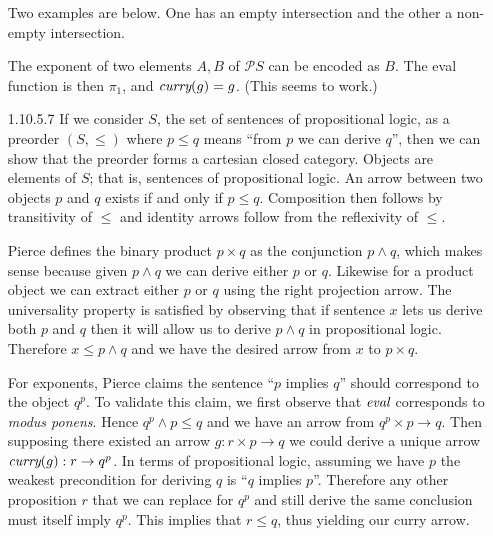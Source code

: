 \documentclass{article}
\newcommand{\curry}[1]{\emph{curry}(#1)}
\newcommand{\eval}{\emph{eval}}
\newcommand{\id}{\emph{id}}
\newcommand{\powset}{\mathcal{P}}
\newcommand{\set}[1]{\{#1\}}
\begin{document}
\begin{enumerate}
  Two examples are below.
  One has an empty intersection and the other a non-empty intersection.
  \begin{center}
  \end{center}

  The exponent of two elements $A,B$ of $\powset{S}$ can be encoded as $B$.
  The eval function is then $\pi_1$, and $\curry{g} = g$.
  (This seems to work.)

\vfill{}
\item [1.10.5.7]
  If we consider $S$, the set of sentences of propositional logic, as a preorder $(S, \le)$ where $p \le q$ means ``from $p$ we can derive $q$'', then we can show that the preorder forms a cartesian closed category.
  Objects are elements of $S$; that is, sentences of propositional logic.
  An arrow between two objects $p$ and $q$ exists if and only if $p \le q$.
  Composition then follows by transitivity of $\le$ and identity arrows follow from the reflexivity of $\le$.

  Pierce defines the binary product $p \times q$ as the conjunction $p \wedge q$, which makes sense because given $p \wedge q$ we can derive either $p$ or $q$.
  Likewise for a product object we can extract either $p$ or $q$ using the right projection arrow.
  The universality property is satisfied by observing that if sentence $x$ lets us derive both $p$ and $q$ then it will allow us to derive $p \wedge q$ in propositional logic.
  Therefore $x \le p \wedge q$ and we have the desired arrow from $x$ to $p \times q$.

  For exponents, Pierce claims the sentence ``$p$ implies $q$'' should correspond to the object $q^p$.
  To validate this claim, we first observe that $\eval$ corresponds to \emph{modus ponens}.
  Hence $q^p \wedge p \le q$ and we have an arrow from $q^p \times p \rightarrow q$.
  Then supposing there existed an arrow $g : r \times p \rightarrow q$ we could derive a unique arrow $\curry{g} : r \rightarrow q^p$.
  In terms of propositional logic, assuming we have $p$ the weakest precondition for deriving $q$ is ``$q$ implies $p$''.
  Therefore any other proposition $r$ that we can replace for $q^p$ and still derive the same conclusion must itself imply $q^p$.
  This implies that $r \le q$, thus yielding our curry arrow.
  

\end{enumerate}
\end{document}

